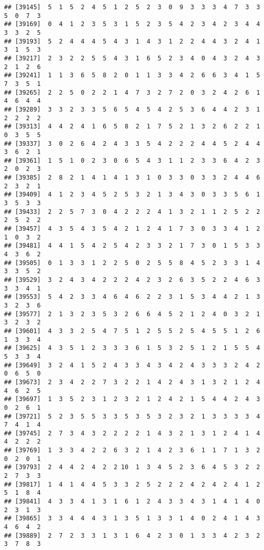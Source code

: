 \documentclass[
]{article}
\begin{document}
\begin{verbatim}
## [39145]  5  1  5  2  4  5  1  2  5  2  3  0  9  3  3  3  4  7  3  3  5  0  7  3
## [39169]  0  4  1  2  3  5  3  1  5  2  3  5  4  2  3  4  2  3  4  4  3  3  2  5
## [39193]  5  2  4  4  4  5  4  3  1  4  3  1  2  2  4  4  3  2  4  1  3  1  5  3
## [39217]  2  3  2  2  5  5  4  3  1  6  5  2  3  4  0  4  3  2  4  3  2  1  2  6
## [39241]  1  1  3  6  5  8  2  0  1  1  3  3  4  2  6  6  3  4  1  5  7  3  5  1
## [39265]  2  2  5  0  2  2  1  4  7  3  2  7  2  0  3  2  4  2  6  1  4  6  4  4
## [39289]  3  3  2  3  3  5  6  5  4  5  4  2  5  3  6  4  4  2  3  1  2  2  2  2
## [39313]  4  4  2  4  1  6  5  8  2  1  7  5  2  1  3  2  6  2  2  1  0  3  5  5
## [39337]  3  0  2  6  4  2  4  3  3  5  4  2  2  2  4  4  5  2  4  4  3  6  2  1
## [39361]  1  5  1  0  2  3  0  6  5  4  3  1  1  2  3  3  6  4  2  3  2  0  2  3
## [39385]  2  8  2  1  4  1  4  1  3  1  0  3  3  0  3  3  2  4  4  6  2  3  2  1
## [39409]  4  1  2  3  4  5  2  5  3  2  1  3  4  3  0  3  3  5  6  1  3  5  3  3
## [39433]  2  2  5  7  3  0  4  2  2  2  4  1  3  2  1  1  2  5  2  2  2  5  2  2
## [39457]  4  3  5  4  3  5  4  2  1  2  4  1  7  3  0  3  3  4  1  2  1  0  3  2
## [39481]  4  4  1  5  4  2  5  4  2  3  3  2  1  7  3  0  1  5  3  3  4  3  6  2
## [39505]  0  1  3  3  1  2  2  5  0  2  5  5  8  4  5  2  3  3  1  4  3  3  5  2
## [39529]  3  2  4  3  4  2  2  2  4  2  3  2  6  3  5  2  2  4  6  3  3  3  4  1
## [39553]  5  4  2  3  3  4  6  4  6  2  2  3  1  5  3  4  4  2  1  3  3  2  3  6
## [39577]  2  1  3  2  3  5  3  2  6  6  4  5  2  1  2  4  0  3  2  1  3  2  3  2
## [39601]  4  3  3  2  5  4  7  5  1  2  5  5  2  5  4  5  5  1  2  6  1  3  3  4
## [39625]  4  3  5  1  2  3  3  3  6  1  5  3  2  5  1  2  1  5  5  4  5  3  3  4
## [39649]  3  2  4  1  5  2  4  3  3  4  3  4  2  4  3  3  3  2  4  2  0  6  5  0
## [39673]  2  3  4  2  2  7  3  2  2  1  4  2  4  3  1  3  2  1  2  4  4  6  2  5
## [39697]  1  3  5  2  3  1  2  3  2  1  2  4  2  1  5  4  4  2  4  3  0  2  6  1
## [39721]  5  2  3  5  5  3  3  5  3  5  3  2  3  2  1  3  3  3  3  4  7  4  1  4
## [39745]  2  7  3  4  3  2  2  2  2  1  4  3  2  1  3  1  2  4  1  4  4  2  2  2
## [39769]  1  3  3  4  2  2  6  3  2  1  4  2  3  6  1  1  7  1  3  2  0  2  0  1
## [39793]  2  4  4  2  4  2  2 10  1  3  4  5  2  3  6  4  5  3  2  2  2  7  3  3
## [39817]  1  4  1  4  4  5  3  3  2  5  2  2  2  4  2  4  2  4  1  2  5  1  8  4
## [39841]  4  3  3  4  1  3  1  6  1  2  4  3  3  4  3  1  4  1  4  0  2  3  1  3
## [39865]  3  3  4  4  4  3  1  3  5  1  3  3  1  4  0  2  4  1  4  3  4  6  4  2
## [39889]  2  7  2  3  3  1  3  1  6  4  2  3  0  1  3  3  4  2  3  2  3  7  8  3

\end{verbatim}
\end{document}
